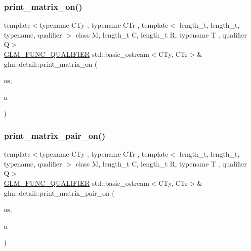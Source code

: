 \mbox{\label{namespaceglm_1_1detail_a45b170ea667900227c6849ad1dfe1bf5}} 
\subsubsection{\texorpdfstring{print\+\_\+matrix\+\_\+on()}{print\_matrix\_on()}}
{\footnotesize\ttfamily template$<$typename C\+Ty , typename C\+Tr , template$<$ length\+\_\+t, length\+\_\+t, typename, qualifier $>$ class M, length\+\_\+t C, length\+\_\+t R, typename T , qualifier Q$>$ \\
\hyperlink{setup_8hpp_a33fdea6f91c5f834105f7415e2a64407}{G\+L\+M\+\_\+\+F\+U\+N\+C\+\_\+\+Q\+U\+A\+L\+I\+F\+I\+ER} std\+::basic\+\_\+ostream$<$C\+Ty, C\+Tr$>$\& glm\+::detail\+::print\+\_\+matrix\+\_\+on (\begin{DoxyParamCaption}\item[{std\+::basic\+\_\+ostream$<$ C\+Ty, C\+Tr $>$ \&}]{os,  }\item[{M$<$ C, R, T, Q $>$ const \&}]{a }\end{DoxyParamCaption})}

\mbox{\label{namespaceglm_1_1detail_a5b82ceb67c3495960b07267d105170c5}} 
\subsubsection{\texorpdfstring{print\+\_\+matrix\+\_\+pair\+\_\+on()}{print\_matrix\_pair\_on()}}
{\footnotesize\ttfamily template$<$typename C\+Ty , typename C\+Tr , template$<$ length\+\_\+t, length\+\_\+t, typename, qualifier $>$ class M, length\+\_\+t C, length\+\_\+t R, typename T , qualifier Q$>$ \\
\hyperlink{setup_8hpp_a33fdea6f91c5f834105f7415e2a64407}{G\+L\+M\+\_\+\+F\+U\+N\+C\+\_\+\+Q\+U\+A\+L\+I\+F\+I\+ER} std\+::basic\+\_\+ostream$<$C\+Ty, C\+Tr$>$\& glm\+::detail\+::print\+\_\+matrix\+\_\+pair\+\_\+on (\begin{DoxyParamCaption}\item[{std\+::basic\+\_\+ostream$<$ C\+Ty, C\+Tr $>$ \&}]{os,  }\item[{std\+::pair$<$ M$<$ C, R, T, Q $>$ const, M$<$ C, R, T, Q $>$ const $>$ const \&}]{a }\end{DoxyParamCaption})}

